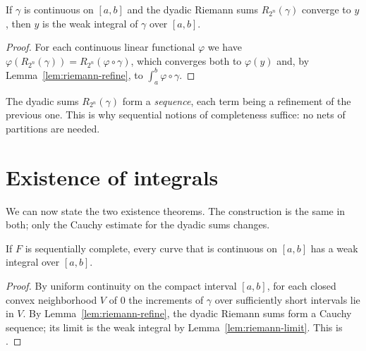 \begin{lemma}
  \label{lem:riemann-limit}
  \leanok
  If $\gamma$ is continuous on $[a, b]$ and the dyadic Riemann sums $R_{2^n}(\gamma)$ converge to
  $y$, then $y$ is the weak integral of $\gamma$ over $[a, b]$.
\end{lemma}

\begin{proof}
  \leanok
  For each continuous linear functional $\varphi$ we have
  $\varphi(R_{2^n}(\gamma)) = R_{2^n}(\varphi \circ \gamma)$, which converges both to
  $\varphi(y)$ and, by Lemma~\ref{lem:riemann-refine}, to $\int_a^b \varphi \circ \gamma$.
\end{proof}

\begin{remark}
  The dyadic sums $R_{2^n}(\gamma)$ form a \emph{sequence}, each term being a refinement of the
  previous one. This is why sequential notions of completeness suffice: no nets of partitions
  are needed.
\end{remark}

\section{Existence of integrals}
\label{sec:existence}

We can now state the two existence theorems. The construction is the same in both; only the
Cauchy estimate for the dyadic sums changes.

\begin{theorem}
  \label{thm:exists-seq}
  \leanok
  If $F$ is sequentially complete, every curve that is continuous on $[a, b]$ has a weak
  integral over $[a, b]$.
\end{theorem}

\begin{proof}
  \leanok
  By uniform continuity on the compact interval $[a, b]$, for each closed convex neighborhood
  $V$ of $0$ the increments of $\gamma$ over sufficiently short intervals lie in $V$. By
  Lemma~\ref{lem:riemann-refine}, the dyadic Riemann sums form a Cauchy sequence; its limit is
  the weak integral by Lemma~\ref{lem:riemann-limit}. This is \cite[1.1.15]{GN26}.
\end{proof}

